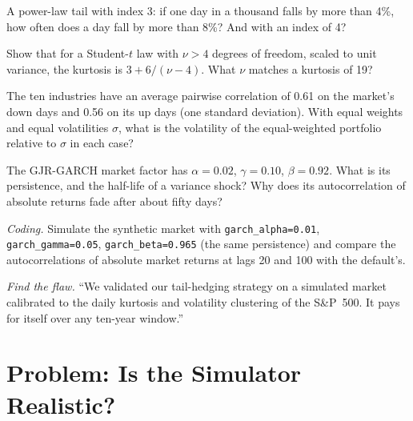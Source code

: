 \begin{exercise}[$\star$]\label{exo:rs:stylised-facts-of-returns:3}
A power-law tail with index 3: if one day in a thousand falls by more than 4\%, how often does a day fall by more than 8\%? And with an
index of 4?
\end{exercise}

\begin{exercise}[$\star\star$]\label{exo:rs:stylised-facts-of-returns:4}
Show that for a Student-$t$ law with $\nu > 4$ degrees of freedom, scaled to unit variance, the kurtosis is $3 + 6/(\nu - 4)$. What $\nu$
matches a kurtosis of 19?
\end{exercise}

\begin{exercise}[$\star\star$]\label{exo:rs:stylised-facts-of-returns:5}
The ten industries have an average pairwise correlation of 0.61 on the market's down days and 0.56 on its up days (one standard
deviation). With equal weights and equal volatilities $\sigma$, what is the volatility of the equal-weighted portfolio relative to
$\sigma$ in each case?
\end{exercise}

\begin{exercise}[$\star\star$]\label{exo:rs:stylised-facts-of-returns:6}
The GJR-GARCH market factor has $\alpha = 0.02$, $\gamma = 0.10$, $\beta = 0.92$. What is its persistence, and the half-life of a
variance shock? Why does its autocorrelation of absolute returns fade after about fifty days?
\end{exercise}

\begin{exercise}[$\star\star\star$]\label{exo:rs:stylised-facts-of-returns:7}
\emph{Coding.} Simulate the synthetic market with \texttt{garch\_alpha=0.01}, \texttt{garch\_gamma=0.05},
\texttt{garch\_beta=0.965} (the same persistence) and compare the autocorrelations of absolute market returns at lags 20 and 100
with the default's.
\end{exercise}

\begin{exercise}[$\star\star\star$]\label{exo:rs:stylised-facts-of-returns:8}
\emph{Find the flaw.} ``We validated our tail-hedging strategy on a simulated market calibrated to the daily kurtosis and volatility
clustering of the S\&P~500. It pays for itself over any ten-year window.''
\end{exercise}

\section{Problem: Is the Simulator Realistic?}

